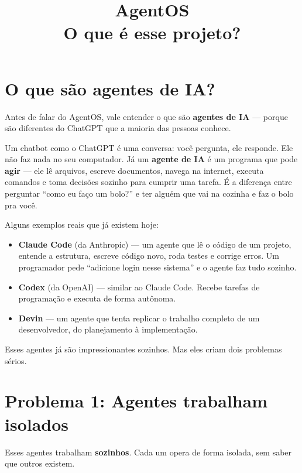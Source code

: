\documentclass[12pt, a4paper]{article}
\title{\Huge\bfseries AgentOS\\[0.3em]\Large\color{muted} O que é esse projeto?}
\author{}
\date{}
\begin{document}
\maketitle
\thispagestyle{empty}

\section{O que são agentes de IA?}

Antes de falar do AgentOS, vale entender o que são \textbf{agentes de IA} --- porque são diferentes do ChatGPT que a maioria das pessoas conhece.

Um chatbot como o ChatGPT é uma conversa: você pergunta, ele responde. Ele não faz nada no seu computador. Já um \textbf{agente de IA} é um programa que pode \textbf{agir} --- ele lê arquivos, escreve documentos, navega na internet, executa comandos e toma decisões sozinho para cumprir uma tarefa. É a diferença entre perguntar ``como eu faço um bolo?'' e ter alguém que vai na cozinha e faz o bolo pra você.

Alguns exemplos reais que já existem hoje:

\begin{itemize}[leftmargin=1.5em]
    \item \textbf{Claude Code} (da Anthropic) --- um agente que lê o código de um projeto, entende a estrutura, escreve código novo, roda testes e corrige erros. Um programador pede ``adicione login nesse sistema'' e o agente faz tudo sozinho.

    \item \textbf{Codex} (da OpenAI) --- similar ao Claude Code. Recebe tarefas de programação e executa de forma autônoma.

    \item \textbf{Devin} --- um agente que tenta replicar o trabalho completo de um desenvolvedor, do planejamento à implementação.
\end{itemize}

Esses agentes já são impressionantes sozinhos. Mas eles criam dois problemas sérios.

\section{Problema 1: Agentes trabalham isolados}

Esses agentes trabalham \textbf{sozinhos}. Cada um opera de forma isolada, sem saber que outros existem.
\end{document}
